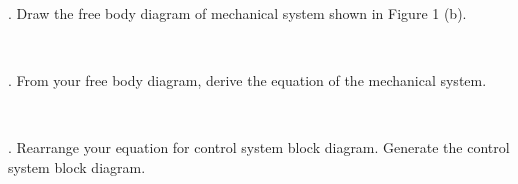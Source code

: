 \documentclass[10pt,a4paper,leqno]{article}
\begin{document}
\begin{CJK*}{UTF8}{gbsn}
 \par \ \par{}. Draw the free body diagram of mechanical system shown in Figure 1 (b).
 \par \ \par{}. From your free body diagram, derive the equation of the mechanical system.
 \par \ \par{}. Rearrange your equation for control system block diagram. Generate the control system block diagram.
 \par \ \par\noindent \nocite{2}
 \par \ \par\noindent \nocite{201}
 \par \ \par\noindent \nocite{202}
 \par \ \par\noindent \nocite{301}
 \par \ \par\noindent \nocite{310}
 \par \ \par\noindent  
 
 \par \ \par\noindent \end{CJK*}
 \par \ \par
\end{document}
